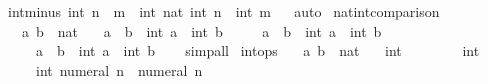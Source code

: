\begin{isabellebody}
\endisatagproof
{\isafoldproof}%
%
\isadelimproof
%
\endisadelimproof
\isanewline
{}\isamarkupfalse%
\ int{\isacharunderscore}{\kern0pt}minus{\isacharcolon}{\kern0pt}\ {\isachardoublequoteopen}int\ {\isacharparenleft}{\kern0pt}n\ {\isacharminus}{\kern0pt}\ m{\isacharparenright}{\kern0pt}\ {\isacharequal}{\kern0pt}\ int\ {\isacharparenleft}{\kern0pt}nat\ {\isacharparenleft}{\kern0pt}int\ n\ {\isacharminus}{\kern0pt}\ int\ m{\isacharparenright}{\kern0pt}{\isacharparenright}{\kern0pt}{\isachardoublequoteclose}%
\isadelimproof
\ %
\endisadelimproof
%
\isatagproof
{}\isamarkupfalse%
\ auto%
\endisatagproof
{\isafoldproof}%
%
\isadelimproof
%
\endisadelimproof
\isanewline
\isanewline
{}\isamarkupfalse%
\ nat{\isacharunderscore}{\kern0pt}int{\isacharunderscore}{\kern0pt}comparison{\isacharcolon}{\kern0pt}\isanewline
\ \ \ a\ b\ {\isacharcolon}{\kern0pt}{\isacharcolon}{\kern0pt}\ nat\isanewline
\ \ \ {\isachardoublequoteopen}{\isacharparenleft}{\kern0pt}a\ {\isacharequal}{\kern0pt}\ b{\isacharparenright}{\kern0pt}\ {\isacharequal}{\kern0pt}\ {\isacharparenleft}{\kern0pt}int\ a\ {\isacharequal}{\kern0pt}\ int\ b{\isacharparenright}{\kern0pt}{\isachardoublequoteclose}\isanewline
\ \ \ \ \ {\isachardoublequoteopen}{\isacharparenleft}{\kern0pt}a\ {\isacharless}{\kern0pt}\ b{\isacharparenright}{\kern0pt}\ {\isacharequal}{\kern0pt}\ {\isacharparenleft}{\kern0pt}int\ a\ {\isacharless}{\kern0pt}\ int\ b{\isacharparenright}{\kern0pt}{\isachardoublequoteclose}\isanewline
\ \ \ \ \ {\isachardoublequoteopen}{\isacharparenleft}{\kern0pt}a\ {\isasymle}\ b{\isacharparenright}{\kern0pt}\ {\isacharequal}{\kern0pt}\ {\isacharparenleft}{\kern0pt}int\ a\ {\isasymle}\ int\ b{\isacharparenright}{\kern0pt}{\isachardoublequoteclose}\isanewline
%
\isadelimproof
\ \ %
\endisadelimproof
%
\isatagproof
{}\isamarkupfalse%
\ simp{\isacharunderscore}{\kern0pt}all%
\endisatagproof
{\isafoldproof}%
%
\isadelimproof
\isanewline
%
\endisadelimproof
\isanewline
{}\isamarkupfalse%
\ int{\isacharunderscore}{\kern0pt}ops{\isacharcolon}{\kern0pt}\isanewline
\ \ \ a\ b\ {\isacharcolon}{\kern0pt}{\isacharcolon}{\kern0pt}\ nat\isanewline
\ \ \ {\isachardoublequoteopen}int\ {}\ {\isacharequal}{\kern0pt}\ {}{\isachardoublequoteclose}\isanewline
\ \ \ \ \ {\isachardoublequoteopen}int\ {}\ {\isacharequal}{\kern0pt}\ {}{\isachardoublequoteclose}\isanewline
\ \ \ \ \ {\isachardoublequoteopen}int\ {\isacharparenleft}{\kern0pt}numeral\ n{\isacharparenright}{\kern0pt}\ {\isacharequal}{\kern0pt}\ numeral\ n{\isachardoublequoteclose}\isanewline

\end{isabellebody}
